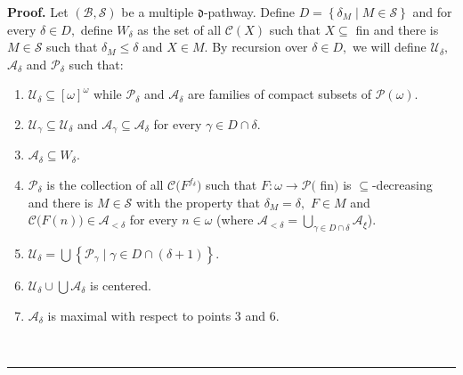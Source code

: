 \documentclass{article}%
\newenvironment{proof}[1][Proof]{\noindent\textbf{#1.} }{\ \rule{0.5em}{0.5em}}
\begin{document}
\begin{proof}
Let $\left(  \mathcal{B},\mathcal{S}\right)  $ be a multiple $\mathfrak{d}%
$-pathway. Define $D=\left\{  \delta_{M}\mid M\in\mathcal{S}\right\}  $ and
for every $\delta\in D,$ define $W_{\delta}$ as the set of all $\mathcal{C}%
\left(  X\right)  $ such that $X\subseteq$ \textsf{fin }and there is
$M\in\mathcal{S}$ such that $\delta_{M}\leq\delta$ and $X\in M.$ By recursion
over $\delta\in D,$ we will define $\mathcal{U}_{\delta},$ $\mathcal{A}%
_{\delta}$ and $\mathcal{P}_{\delta}$ such that:

\begin{enumerate}
\item $\mathcal{U}_{\delta}\subseteq\left[  \omega\right]  ^{\omega}$ while
$\mathcal{P}_{\delta}$ and $\mathcal{A}_{\delta}$ are families of compact
subsets of $\mathcal{P}\left(  \omega\right)  .$

\item $\mathcal{U}_{\gamma}\subseteq\mathcal{U}_{\delta}$ and $\mathcal{A}%
_{\gamma}\subseteq\mathcal{A}_{\delta}$ for every $\gamma\in D\cap\delta.$

\item $\mathcal{A}_{\delta}\subseteq W_{\delta}.$

\item $\mathcal{P}_{\delta}$ is the collection of all $\mathcal{C(}%
F^{f_{\delta}})$ such that $F:\omega\longrightarrow\mathcal{P(}$%
\textsf{fin}$)$\textsf{ is }$\subseteq$-decreasing and there is $M\in
\mathcal{S}$ with the property that $\delta_{M}=\delta,$ $F\in M$ and
$\mathcal{C(}F\left(  n\right)  )\in\mathcal{A}_{<\delta}$ for every
$n\in\omega$ (where $\mathcal{A}_{<\delta}=%
{\textstyle\bigcup\limits_{\gamma\in D\cap\delta}}
\mathcal{A}_{\xi}$).

\item $\mathcal{U}_{\delta}=%
{\textstyle\bigcup}
\left\{  \mathcal{P}_{\gamma}\mid\gamma\in D\cap\left(  \delta+1\right)
\right\}  .$

\item $\mathcal{U}_{\delta}\cup%
{\textstyle\bigcup}
\mathcal{A}_{\delta}$ is centered.

\item $\mathcal{A}_{\delta}$ is maximal with respect to points 3 and 6.
\end{enumerate}


\end{proof}
\end{document}
